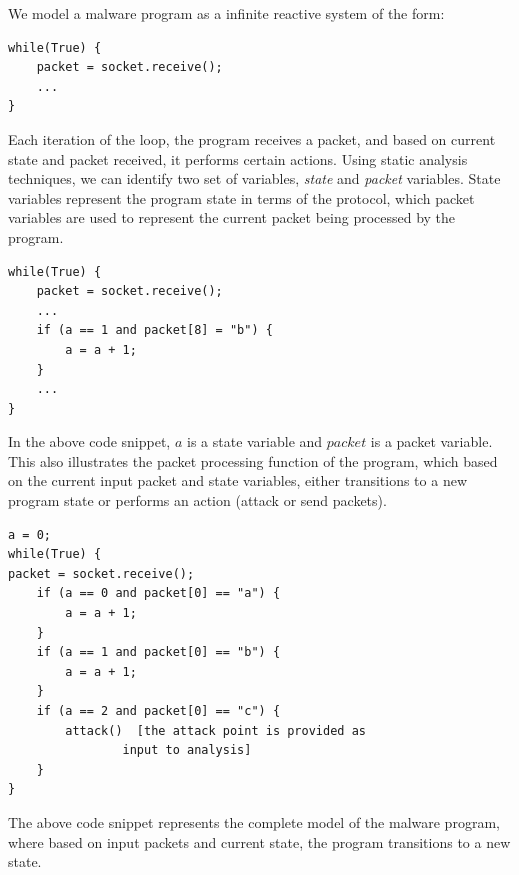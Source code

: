 \documentclass[twocolumn, 11pt]{paper}
\begin{document}
We model a malware program as a infinite reactive system 
of the form:
\begin{lstlisting}	
while(True) {
	packet = socket.receive();
	...
}
\end{lstlisting}
Each iteration of the loop, the program receives a
packet, and based on current state and packet received,
it performs certain actions. Using static analysis
techniques, we can identify two set of variables, \emph{state}
and \emph{packet} variables. State variables represent the 
program state in terms of the protocol, which packet variables
are used to represent the current packet being processed by
the program.
\begin{lstlisting}	
while(True) {
	packet = socket.receive();
	...
	if (a == 1 and packet[8] = "b") {
		a = a + 1;
	}
	...
}
\end{lstlisting}	
In the above code snippet, $a$ is a state variable
and $packet$ is a packet variable. This also
illustrates the packet processing 
function of the program, which based on the current
input packet and state variables, either transitions
to a new program state or performs an action (attack or
send packets). 
\begin{lstlisting}	
a = 0;
while(True) {
packet = socket.receive();
	if (a == 0 and packet[0] == "a") {
		a = a + 1;
	}
	if (a == 1 and packet[0] == "b") {
		a = a + 1;
	}
	if (a == 2 and packet[0] == "c") {
		attack()  [the attack point is provided as 
				input to analysis]
	}	
}
\end{lstlisting}	
The above code snippet represents the complete model
of the malware program, where based on input packets and
current state, the program transitions to a new state. 
%
\end{document}
